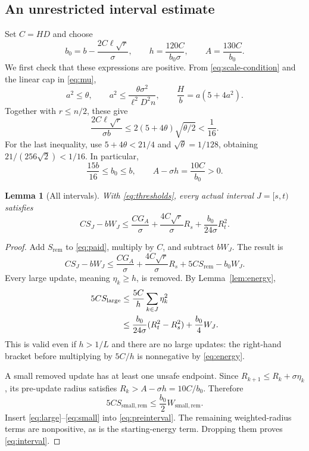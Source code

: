 \documentclass[11pt]{article}
\newtheorem{lemma}[theorem]{Lemma}
\theoremstyle{remark}
\begin{document}
\subsection{An unrestricted interval estimate}
Set $C=HD$ and choose
\begin{equation}\label{eq:thresholds}
 b_0=b-\frac{2C\ell\sqrt r}{\sigma},\qquad
 h=\frac{120C}{b_0\sigma},\qquad A=\frac{130C}{b_0}.
\end{equation}
We first check that these expressions are positive. From
\eqref{eq:scale-condition} and the linear cap in \eqref{eq:mu},
\[
 a^2\le\theta,\qquad
 a^2\le\frac{\theta\sigma^2}{\ell^2D^2n},\qquad
 \frac Hb=a(5+4a^2).
\]
Together with $r\le n/2$, these give
\[
 \frac{2C\ell\sqrt r}{\sigma b}
 \le2(5+4\theta)\sqrt{\theta/2}<\frac1{16}.
\]
For the last inequality, use $5+4\theta<21/4$ and
$\sqrt\theta=1/128$, obtaining $21/(256\sqrt2)<1/16$.
In particular,
\begin{equation}\label{eq:b0}
 \frac{15b}{16}\le b_0\le b,\qquad
 A-\sigma h=\frac{10C}{b_0}>0.
\end{equation}

\begin{lemma}[All intervals]\label{lem:interval}
With \eqref{eq:thresholds}, every actual interval $J=[s,t)$ satisfies
\begin{equation}\label{eq:interval}
 C S_J-bW_J
 \le\frac{C G_A}{\sigma}
       +\frac{4C\sqrt r}{\sigma}R_s
       +\frac{b_0}{24\sigma}R_t^2.
\end{equation}
\end{lemma}
\begin{proof}
Add $S_{\mathrm{rem}}$ to \eqref{eq:paid}, multiply by $C$, and
subtract $bW_J$. The result is
\begin{equation}\label{eq:preinterval}
 CS_J-bW_J\le\frac{CG_A}{\sigma}
       +\frac{4C\sqrt r}{\sigma}R_s
       +5CS_{\mathrm{rem}}-b_0W_J.
\end{equation}
Every large update, meaning $\eta_k\ge h$, is removed. By
Lemma~\ref{lem:energy},
\begin{align}
 5CS_{\mathrm{large}}
 &\le\frac{5C}{h}\sum_{k\in J}\eta_k^2\notag\\
 &\le\frac{b_0}{24\sigma}(R_t^2-R_s^2)
                  +\frac{b_0}4 W_J.\label{eq:large}
\end{align}
This is valid even if $h>1/L$ and there are no large updates: the
right-hand bracket before multiplying by $5C/h$ is nonnegative by
\eqref{eq:energy}.

A small removed update has at least one unsafe endpoint. Since
$R_{k+1}\le R_k+\sigma\eta_k$, its pre-update radius satisfies
$R_k>A-\sigma h=10C/b_0$. Therefore
\begin{equation}\label{eq:small}
 5CS_{\mathrm{small,rem}}\le\frac{b_0}2W_{\mathrm{small,rem}}.
\end{equation}
Insert \eqref{eq:large}--\eqref{eq:small} into
\eqref{eq:preinterval}. The remaining weighted-radius terms are
nonpositive, as is the starting-energy term. Dropping them proves
\eqref{eq:interval}.
\end{proof}
\end{document}
